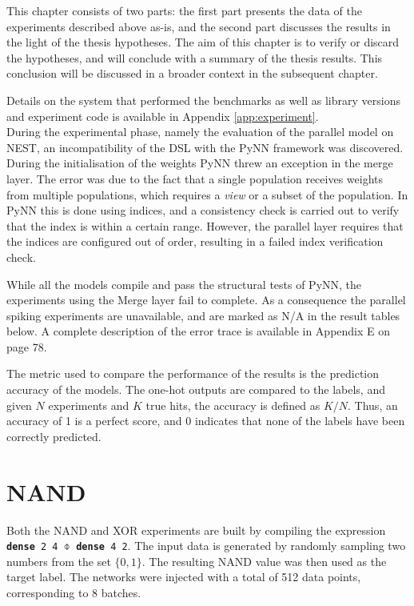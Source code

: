 \documentclass[report.tex]{subfiles}
\begin{document}
This chapter consists of two parts:
the first part presents the data of the experiments described above as-is,
and the second part discusses the results in the light of the thesis hypotheses.
The aim of this chapter is to verify or discard the hypotheses, and will
conclude with a summary of the thesis results.
This conclusion will be discussed in a broader context in the subsequent chapter.

Details on the system that performed the benchmarks as well as
library versions and experiment code is available in Appendix
\ref{app:experiment}.
\\[0.1cm]

During the experimental phase, namely the evaluation of the parallel model on
NEST, an incompatibility of the DSL with the PyNN framework was discovered.
During the initialisation of the weights PyNN threw an exception in the 
merge layer.
The error was due to the fact that a single population receives weights
from multiple populations, which requires a \textit{view} or a subset of the
population. 
In PyNN this is done using indices, and a consistency check is carried out to
verify that the index is within a certain range.
However, the parallel layer requires that the indices are configured out of
order, resulting in a failed index verification check.

While all the models compile and pass the structural tests of PyNN,
the experiments using the Merge layer fail to complete.
As a consequence the parallel spiking experiments are unavailable, and are
marked as N/A in the result tables below.
A complete description of the error trace is available in Appendix
E on page 78.

The metric used to compare the performance of the results is the prediction
accuracy of the models. 
The one-hot outputs are compared to the labels, and given $N$ experiments and
$K$ true hits, the accuracy is defined as $K / N$.
Thus, an accuracy of 1 is a perfect score, and 0 indicates that none of the
labels have been correctly predicted.

\section{NAND}
Both the NAND and XOR experiments are built by compiling the expression 
\texttt{\textbf{dense} 2 4 $\obar$ \textbf{dense} 4 2}.
The input data is generated by randomly sampling two numbers from the set
$\{0, 1\}$.
The resulting NAND value was then used as the target label.
The networks were injected with a total of 512 data points, corresponding to 8
batches.
\end{document}

